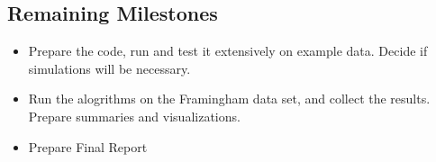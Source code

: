 \documentclass{sig-alternate-05-2015}
\begin{document}
\subsection{Remaining Milestones}

\begin{itemize}
\item Prepare the code, run and test it extensively on example data. Decide if simulations will be necessary.
\item Run the alogrithms on the Framingham data set, and collect the results. Prepare summaries and visualizations.
\item Prepare Final Report
\end{itemize}



\end{document}
